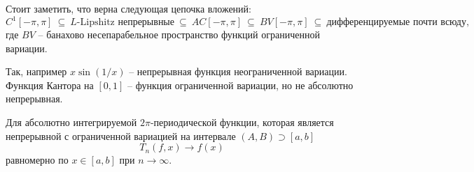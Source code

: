 
Стоит заметить, что верна следующая цепочка вложений:
\begin{equation*}
    C^1[-\pi, \pi] \ \subseteq \ 
     L\text{-Lipshitz непрерывные}  \ \subseteq \ 
     AC[-\pi, \pi] \ \subseteq \ 
     BV[-\pi, \pi] \ \subseteq \ 
     \text{дифференцируемые почти всюду},
\end{equation*}
где $BV$ -- банахово несепарабельное пространство функций ограниченной вариации. 

Так, например $x \sin (1/x)$ -- непрерывная функция неограниченной вариации. Функция Кантора на $[0, 1]$ -- функция ограниченной вариации, но не абсолютно непрерывная. 




\begin{to_thr}
    Для абсолютно интегрируемой $2\pi$-периодической функции, которая является непрерывной с ограниченной вариацией на интервале $(A, B) \supset [a, b]$
    \begin{equation*}
        T_n (f, x) \to f(x)
    \end{equation*}
    равномерно по $x \in [a, b]$ при $n \to \infty$.
\end{to_thr}





